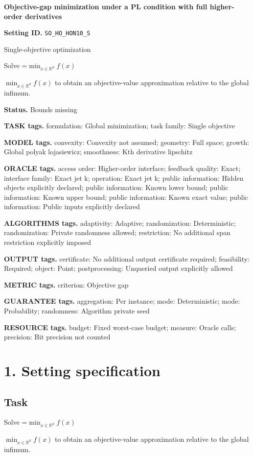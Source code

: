 \documentclass[10pt,a4paper]{article}
\newcommand{\AtlasMath}[1]{\par\begingroup\centering\setbox0=\hbox{$\displaystyle #1$}\ifdim\wd0>1.4\linewidth\typeout{ATLAS WIDE FORMULA: \the\wd0}\fi\ifdim\wd0>\linewidth\resizebox{\linewidth}{!}{\box0}\else\box0\fi\par\endgroup}
\newcommand{\AtlasInlineMath}[1]{\begingroup\setbox0=\hbox{$#1$}\ifdim\wd0>.4\linewidth\endgroup\AtlasMath{#1}\else\endgroup$#1$\fi}
\begin{document}
\raggedright

{\LARGE\bfseries\sffamily\color{AtlasNavy} Objective-gap minimization under a PL condition with full higher-order derivatives\par}\vspace{5pt}
\textbf{Setting ID.} \texttt{SO\_\allowbreak{}HO\_\allowbreak{}HON10\_\allowbreak{}S}

Single-objective optimization

Solve \AtlasInlineMath{\min_{x\in \mathbb{R}^d}f(x)} to obtain an objective-value approximation relative to the global infimum.

\textbf{Status.} Bounds missing

\textbf{TASK tags.} formulation: Global minimization; task family: Single objective

\textbf{MODEL tags.} convexity: Convexity not assumed; geometry: Full space; growth: Global polyak lojasiewicz; smoothness: Kth derivative lipschitz

\textbf{ORACLE tags.} access order: Higher-order interface; feedback quality: Exact; interface family: Exact jet k; operation: Exact jet k; public information: Hidden objects explicitly declared; public information: Known lower bound; public information: Known upper bound; public information: Known exact value; public information: Public inputs explicitly declared

\textbf{ALGORITHMS tags.} adaptivity: Adaptive; randomization: Deterministic; randomization: Private randomness allowed; restriction: No additional span restriction explicitly imposed

\textbf{OUTPUT tags.} certificate: No additional output certificate required; feasibility: Required; object: Point; postprocessing: Unqueried output explicitly allowed

\textbf{METRIC tags.} criterion: Objective gap

\textbf{GUARANTEE tags.} aggregation: Per instance; mode: Deterministic; mode: Probability; randomness: Algorithm private seed

\textbf{RESOURCE tags.} budget: Fixed worst-case budget; measure: Oracle calls; precision: Bit precision not counted

\section{1. Setting specification}
\subsection{Task}
Solve \AtlasInlineMath{\min_{x\in \mathbb{R}^d}f(x)} to obtain an objective-value approximation relative to the global infimum.
\end{document}
